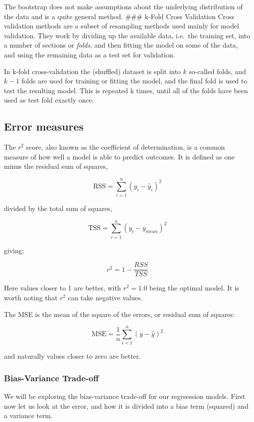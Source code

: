 \documentclass[11pt]{article}
\begin{document}
The bootstrap does not make assumptions about the underlying
distribution of the data and is a quite general method. \#\#\# k-Fold
Cross Validation Cross validation methods are a subset of resampling
methods used mainly for model validation. They work by dividing up the
available data, i.e.~the training set, into a number of sections or
\emph{folds}, and then fitting the model on some of the data, and using
the remaining data as a test set for validation.

In k-fold cross-validation the (shuffled) dataset is split into \(k\)
so-called folds, and \(k-1\) folds are used for training or fitting the
model, and the final fold is used to test the resulting model. This is
repeated k times, until all of the folds have been used as test fold
exactly once.

    \hypertarget{error-measures}{%
\subsection{Error measures}\label{error-measures}}

The \(r^2\) score, also known as the coefficient of determination, is a
common measure of how well a model is able to predict outcomes. It is
defined as one minus the residual sum of squares,

\[
\text{RSS} = \sum_{i=1}^{n}\left(y_i-\hat{y}_i\right)^2
\]

divided by the total sum of squares,

\[
\text{TSS} = \sum_{i=1}^{n}\left(y_i-{y}_{mean}\right)^2
\]

giving;

\[
r^2 = 1 - \frac{RSS}{TSS}
\]

Here values closer to 1 are better, with \(r^2=1.0\) being the optimal
model. It is worth noting that \(r^2\) can take negative values.

The MSE is the mean of the square of the errors, or residual sum of
squares:

\[
\text{MSE} = \frac{1}{n} \sum_{i=1}^{n} (y-\hat{y})^2
\]

and naturally values closer to zero are better.

    \hypertarget{bias-variance-trade-off}{%
\subsubsection{Bias-Variance Trade-off}\label{bias-variance-trade-off}}

We will be exploring the bias-variance trade-off for our regrsession
models. First now let us look at the error, and how it is divided into a
bias term (squared) and a variance term.
\end{document}
